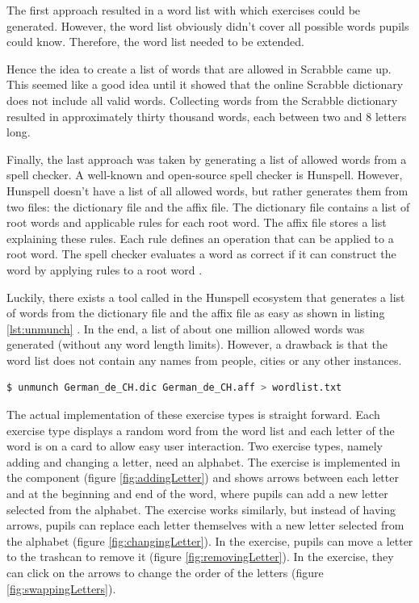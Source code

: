 The first approach resulted in a word list with which exercises could be generated. However, the word list obviously didn't cover all possible words pupils could know. Therefore, the word list needed to be extended.

Hence the idea to create a list of words that are allowed in Scrabble came up. This seemed like a good idea until it showed that the online Scrabble dictionary does not include all valid words.
Collecting words from the Scrabble dictionary resulted in approximately thirty thousand words, each between two and 8 letters long.

Finally, the last approach was taken by generating a list of allowed words from a spell checker. A well-known and open-source spell checker is Hunspell. However, Hunspell doesn't have a list of all allowed words, but rather generates them from two files: the dictionary file and the affix file. The dictionary file contains a list of root words and applicable rules for each root word. The affix file stores a list explaining these rules. Each rule defines an operation that can be applied to a root word. The spell checker evaluates a word as correct if it can construct the word by applying rules to a root word \cite{Hunspell}.

Luckily, there exists a tool called  in the Hunspell ecosystem that generates a list of words from the dictionary file and the affix file as easy as shown in listing \ref{lst:unmunch} \cite{HunspellGithub}.
In the end, a list of about one million allowed words was generated (without any word length limits). However, a drawback is that the word list does not contain any names from people, cities or any other instances. 

\begin{lstlisting}[language=Bash,caption={Bash command to unmunch a dictionary file and a affix file to a list of words},label={lst:unmunch}]
$ unmunch German_de_CH.dic German_de_CH.aff > wordlist.txt
\end{lstlisting}

The actual implementation of these exercise types is straight forward. Each exercise type displays a random word from the word list and each letter of the word is on a card to allow easy user interaction. Two exercise types, namely adding and changing a letter, need an alphabet. The  exercise is implemented in the  component (figure \ref{fig:addingLetter}) and shows arrows between each letter and at the beginning and end of the word, where pupils can add a new letter selected from the alphabet. The  exercise works similarly, but instead of having arrows, pupils can replace each letter themselves with a new letter selected from the alphabet (figure \ref{fig:changingLetter}). In the  exercise, pupils can move a letter to the trashcan to remove it (figure \ref{fig:removingLetter}). In the  exercise, they can click on the arrows to change the order of the letters (figure \ref{fig:swappingLetters}).

